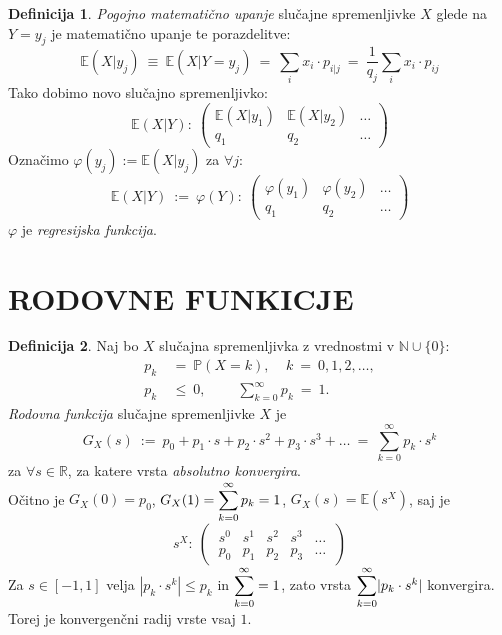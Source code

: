 \documentclass[11pt]{article}
\theoremstyle{definition}
\newtheorem{definicija}{Definicija}[section]
\theoremstyle{definition}
\theoremstyle{definition}
\begin{document}
\begin{definicija}

\textit{Pogojno matematično upanje} slučajne spremenljivke $X$ glede na $Y = y_j$ je matematično upanje te porazdelitve:
$$\mathbb{E}(X | y_j) ~\equiv~ \mathbb{E}(X | Y = y_j) ~=~ \sum_i x_i \cdot p_{i|j} ~=~ \frac{1}{q_j} \sum_i x_i \cdot p_{ij}$$
Tako dobimo novo slučajno spremenljivko:
$$\mathbb{E}(X | Y): ~\begin{pmatrix}
	\mathbb{E}(X | y_1) & \mathbb{E}(X | y_2) & \ldots \\
	q_1 & q_2 & \ldots
\end{pmatrix}$$
Označimo $\varphi(y_j) := \mathbb{E}(X | y_j)$ za $\forall j$:
$$\mathbb{E}(X | Y) ~:=~ \varphi(Y): ~\begin{pmatrix}
	\varphi(y_1) & \varphi(y_2) & \ldots \\
	q_1 & q_2 & \ldots
\end{pmatrix}$$
$\varphi$ je \textit{regresijska funkcija}.

\end{definicija}
\vspace{0.5cm}

\pagebreak


\section{RODOVNE FUNKICJE}
\vspace{0.5cm}

\begin{definicija}

Naj bo $X$ slučajna spremenljivka z vrednostmi v $\mathbb{N} \cup \{0\}$:
\begin{align*}
	p_k ~&=~ \mathbb{P}(X = k), ~~~~~k ~=~ 0, 1, 2, \ldots, \\
	p_k ~&\leq~ 0, ~~~~~~~~~~\sum_{k=0}^{\infty} p_k ~=~ 1.
\end{align*}
\textit{Rodovna funkcija} slučajne spremenljivke $X$ je 
$$G_X(s) ~:=~ p_0 + p_1 \cdot s + p_2 \cdot s^2 + p_3 \cdot s^3 + \ldots ~=~ \sum_{k=0}^{\infty} p_k \cdot s^k$$
za $\forall s \in \mathbb{R}$, za katere vrsta \textit{absolutno konvergira}. \\

\noindent Očitno je $G_X(0) = p_0$, $G_X(1) = \mathlarger{\sum_{k=0}^{\infty} p_k} = 1$, $G_X(s) = \mathbb{E}(s^X)$, saj je
$$s^X: ~\begin{pmatrix}
	~s^0 & s^1 & s^2 & s^3 & \ldots~ \\
	~p_0 & p_1 & p_2 & p_3 & \ldots~
\end{pmatrix}$$
Za $s \in [-1, 1]$ velja $|p_k \cdot s^k| \leq p_k$ in $\mathlarger{\sum_{k=0}^{\infty} = 1}$, zato vrsta $\mathlarger{\sum_{k=0}^{\infty}} |p_k \cdot s^k|$ konvergira. Torej je konvergenčni radij vrste vsaj $1$.

\end{definicija}
\vspace{0.5cm}
\end{document}
